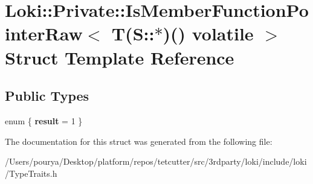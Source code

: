 \hypertarget{structLoki_1_1Private_1_1IsMemberFunctionPointerRaw_3_01T_07S_1_1_5_08_07_08_01volatile_01_4}{}\section{Loki\+:\+:Private\+:\+:Is\+Member\+Function\+Pointer\+Raw$<$ T(S\+:\+:$\ast$)() volatile $>$ Struct Template Reference}
\label{structLoki_1_1Private_1_1IsMemberFunctionPointerRaw_3_01T_07S_1_1_5_08_07_08_01volatile_01_4}
\subsection*{Public Types}
\begin{DoxyCompactItemize}
\item 
\hypertarget{structLoki_1_1Private_1_1IsMemberFunctionPointerRaw_3_01T_07S_1_1_5_08_07_08_01volatile_01_4_ace1586ac66ab75518f1898ce5c9e07d2}{}enum \{ {\bfseries result} = 1
 \}\label{structLoki_1_1Private_1_1IsMemberFunctionPointerRaw_3_01T_07S_1_1_5_08_07_08_01volatile_01_4_ace1586ac66ab75518f1898ce5c9e07d2}

\end{DoxyCompactItemize}


The documentation for this struct was generated from the following file\+:\begin{DoxyCompactItemize}
\item 
/\+Users/pourya/\+Desktop/platform/repos/tetcutter/src/3rdparty/loki/include/loki/Type\+Traits.\+h\end{DoxyCompactItemize}
